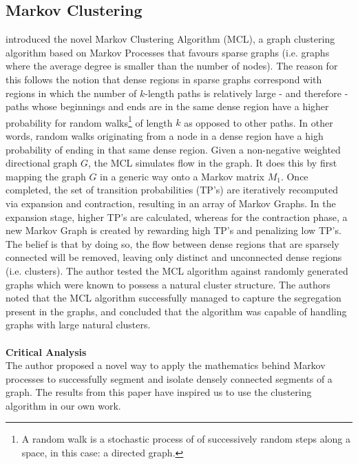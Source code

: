 \subsection{Markov Clustering}
 introduced the novel Markov Clustering Algorithm (MCL), a graph clustering algorithm based on Markov Processes  that favours sparse graphs (i.e. graphs where the average degree is smaller than the number of nodes). 
The reason for this follows the notion that dense regions in sparse graphs correspond with regions in which the number of $k$-length paths is relatively large - and therefore - paths whose beginnings and ends are in the same dense region have a higher probability for random walks\footnote{A random walk is a stochastic process of of successively random steps along a space, in this case: a directed graph.} of length $k$ as opposed to other paths.
In other words, random walks originating from a node in a dense region have a high probability of ending in that same dense region.
Given a non-negative weighted directional graph $G$, the MCL simulates flow in the graph. 
It does this by first mapping the graph $G$ in a generic way onto a Markov matrix $M_1$.
Once completed, the set of transition probabilities (TP's) are iteratively recomputed via expansion and contraction, resulting in an array of Markov Graphs.
In the expansion stage, higher TP's are calculated, whereas for the contraction phase, a new Markov Graph is created by rewarding high TP's and penalizing low TP's.
The belief is that by doing so, the flow between dense regions that are sparsely connected will be removed, leaving only distinct and unconnected dense regions (i.e. clusters).
The author tested the MCL algorithm against randomly generated graphs which were known to possess a natural cluster structure. The authors noted that the MCL algorithm successfully managed to capture the segregation present in the graphs, and concluded that the algorithm was capable of handling graphs with large natural clusters.
\\\\\textbf{Critical Analysis}\\
The author proposed a novel way to apply the mathematics behind Markov processes to successfully segment and isolate densely connected segments of a graph. The results from this paper have inspired us to use the clustering algorithm in our own work.


